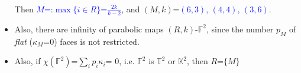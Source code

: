 \documentclass{beamer}
\begin{document}
\begin{frame}
\begin{itemize}
Then  \textcolor{blue}{$M$=:$\max\{i\in R\}$=$\frac{2k}{k-2}$}, 
and $(M,k)$=\textcolor{blue}{$(6,3),\,(4,4),\,(3,6)$}.


\item Also, there are infinity of parabolic maps $(R,k)$-$\mathbb{F}^2$, since the number
$p_M$ of {\em flat} ($\kappa_M$=$0$) faces is not restricted.

\item  %
Also, if $\chi ({\mathbb{F}^2})$=${\sum_{i}p_i\kappa_i}$=
$0$, i.e.  ${\mathbb{F}^2}$ is $\mathbb{T}^2$ or $\mathbb{K}^2$, then $R$=$\{M\}$ 
\end{itemize}\end{frame}






\end{document}
